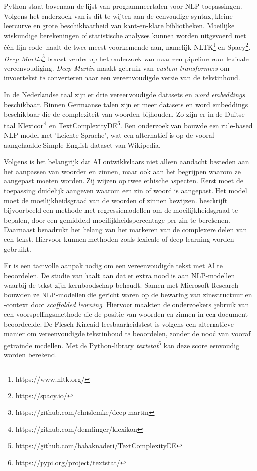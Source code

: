 Python staat bovenaan de lijst van programmeertalen voor NLP-toepassingen. Volgens het onderzoek van \textcite{Thangarajah2019} is dit te wijten aan de eenvoudige syntax, kleine leercurve en grote beschikbaarheid van kant-en-klare bibliotheken. Moeilijke wiskundige berekeningen of statistische analyses kunnen worden uitgevoerd met één lijn code. \textcite{Malik2022} haalt de twee meest voorkomende aan, namelijk NLTK\footnote{https://www.nltk.org/} en Spacy\footnote{https://spacy.io/}. \textit{Deep Martin}\footnote{https://github.com/chrislemke/deep-martin} bouwt verder op het onderzoek van \textcite{Shardlow2014} naar een pipeline voor lexicale vereenvoudiging. \textit{Deep Martin} maakt gebruik van \textit{custom transformers} om invoertekst te converteren naar een vereenvoudigde versie van de tekstinhoud.

In de Nederlandse taal zijn er drie vereenvoudigde datasets en \textit{word embeddings} beschikbaar. Binnen Germaanse talen zijn er meer datasets en word embeddings beschikbaar die de complexiteit van woorden bijhouden. Zo zijn er in de Duitse taal Klexicon\footnote{https://github.com/dennlinger/klexikon} en TextComplexityDE\footnote{https://github.com/babaknaderi/TextComplexityDE}. Een onderzoek van \textcite{Suter2016} bouwde een rule-based NLP-model met 'Leichte Sprache', wat een alternatief is op de vooraf aangehaalde Simple English dataset van Wikipedia.

Volgens \textcite{Garbacea2021} is het belangrijk dat AI ontwikkelaars niet alleen aandacht besteden aan het aanpassen van woorden en zinnen, maar ook aan het begrijpen waarom ze aangepast moeten worden. Zij wijzen op twee ethische aspecten. Eerst moet de toepassing duidelijk aangeven waarom een zin of woord is aangepast. Het model moet de moeilijkheidsgraad van de woorden of zinnen bewijzen. \textcite{Iavarone2021} beschrijft bijvoorbeeld een methode met regressiemodellen om de moeilijkheidsgraad te bepalen, door een gemiddeld moeilijkheidspercentage per zin te berekenen. Daarnaast benadrukt \textcite{Garbacea2021} het belang van het markeren van de complexere delen van een tekst. Hiervoor kunnen methoden zoals lexicale of deep learning worden gebruikt.

Er is een tactvolle aanpak nodig om een vereenvoudigde tekst met AI te beoordelen. De studie van \textcite{Swayamdipta2019} haalt aan dat er extra nood is aan NLP-modellen waarbij de tekst zijn kernboodschap behoudt. Samen met Microsoft Research bouwden ze NLP-modellen die gericht waren op de bewaring van zinsstructuur en -context door \emph{scaffolded learning}. Hiervoor maakten de onderzoekers gebruik van een voorspellingsmethode die de positie van woorden en zinnen in een document beoordeelde. De Flesch-Kincaid leesbaarheidstest is volgens \textcite{Readable2021} een alternatieve manier om vereenvoudigde tekstinhoud te beoordelen, zonder de nood van vooraf getrainde modellen. Met de Python-library \textit{textstat}\footnote{https://pypi.org/project/textstat/} kan deze score eenvoudig worden berekend. 

